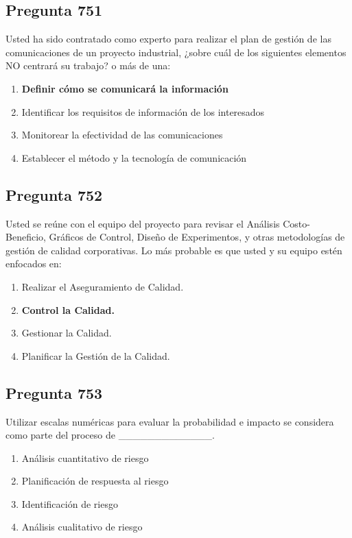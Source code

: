 \documentclass[11pt,a4paper]{article}
\begin{document}
\subsection*{Pregunta 751}
Usted ha sido contratado como experto para realizar el plan de gestión de las comunicaciones de un proyecto industrial, ¿sobre cuál de los siguientes elementos NO centrará su trabajo? o más de una:

\begin{enumerate}[label=\alph*)]
  \item \textbf{Definir cómo se comunicará la información}
  \item Identificar los requisitos de información de los interesados
  \item Monitorear la efectividad de las comunicaciones
  \item Establecer el método y la tecnología de comunicación
\end{enumerate}

\subsection*{Pregunta 752}
Usted se reúne con el equipo del proyecto para revisar el Análisis Costo- Beneficio, Gráficos de Control, Diseño de Experimentos, y otras metodologías de gestión de calidad corporativas. Lo más probable es que usted y su equipo estén enfocados en:

\begin{enumerate}[label=\alph*)]
  \item Realizar el Aseguramiento de Calidad.
  \item \textbf{Control la Calidad.}
  \item Gestionar la Calidad.
  \item Planificar la Gestión de la Calidad.
\end{enumerate}

\subsection*{Pregunta 753}
Utilizar escalas numéricas para evaluar la probabilidad e impacto se considera como parte del proceso de \_\_\_\_\_\_\_\_\_\_\_\_\_.

\begin{enumerate}[label=\alph*)]
  \item Análisis cuantitativo de riesgo
  \item Planificación de respuesta al riesgo
  \item Identificación de riesgo
  \item Análisis cualitativo de riesgo
\end{enumerate}
\end{document}
